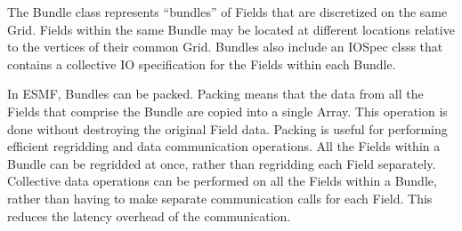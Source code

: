 
The Bundle class represents ``bundles'' of Fields that are 
discretized on the same Grid.  Fields within the same Bundle 
may be located at different locations relative to the vertices of
their common Grid.  Bundles also include an IOSpec clsss that 
contains a collective IO specification for the Fields within 
each Bundle.

In ESMF, Bundles can be packed.  Packing means that the data from all the
Fields that comprise the Bundle are copied into a single Array.  
This operation is done without destroying the original Field 
data.  Packing is useful for performing efficient regridding and 
data communication operations.  All the Fields within a Bundle 
can be regridded at once, rather than regridding each Field 
separately.  Collective data operations can be performed on all the
Fields within a Bundle, rather than having to make separate 
communication calls for each Field.  This reduces the latency overhead
of the communication.


